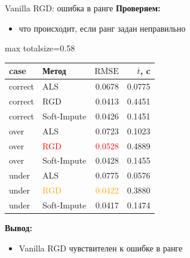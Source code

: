 \documentclass[aspectratio=169,xcolor=dvipsnames]{beamer}
\begin{document}
\begin{frame}{Vanilla RGD: ошибка в ранге}
\scriptsize
\textbf{Проверяем:}
\begin{itemize}
\item что происходит, если ранг задан неправильно
\end{itemize}

\begin{center}
\begin{adjustbox}{max totalsize={\textwidth}{0.58\textheight}}
\begin{tabular}{llrr}
\toprule
case & Метод & $\overline{\mathrm{RMSE}}$ & $\overline{t}$, c \\
\midrule
correct & ALS & 0.0678 & 0.0775 \\
correct & RGD & 0.0413 & 0.4451 \\
correct & Soft-Impute & 0.0426 & 0.1451 \\
\midrule
over & ALS & 0.0723 & 0.1023 \\
over & \textcolor{red}{RGD} & \textcolor{red}{0.0528} & 0.4889 \\
over & Soft-Impute & 0.0428 & 0.1455 \\
\midrule
under & ALS & 0.0775 & 0.0576 \\
under & \textcolor{orange}{RGD} & \textcolor{orange}{0.0422} & 0.3880 \\
under & Soft-Impute & 0.0417 & 0.1474 \\
\bottomrule
\end{tabular}
\end{adjustbox}
\end{center}

\textbf{Вывод:}
\begin{itemize}
\item Vanilla RGD чувствителен к ошибке в ранге
\end{itemize}
\end{frame}
\end{document}
